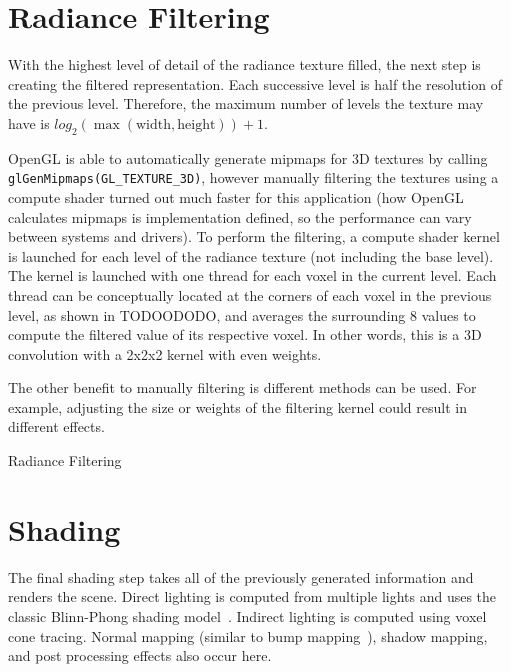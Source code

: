 
\section{Radiance Filtering}
With the highest level of detail of the radiance texture filled, the next step is creating the filtered representation. Each successive level is half the resolution of the previous level. Therefore, the maximum number of levels the texture may have is $log_2 (\max (\text{width}, \text{height})) + 1$.

OpenGL is able to automatically generate mipmaps for 3D textures by calling \verb#glGenMipmaps(GL_TEXTURE_3D)#, however manually filtering the textures using a compute shader turned out much faster for this application (how OpenGL calculates mipmaps is implementation defined, so the performance can vary between systems and drivers). To perform the filtering, a compute shader kernel is launched for each level of the radiance texture (not including the base level). The kernel is launched with one thread for each voxel in the current level. Each thread can be conceptually located at the corners of each voxel in the previous level, as shown in TODOODODO, and averages the surrounding 8 values to compute the filtered value of its respective voxel. In other words, this is a 3D convolution with a 2x2x2 kernel with even weights.

The other benefit to manually filtering is different methods can be used. For example, adjusting the size or weights of the filtering kernel could result in different effects.

\begin{algorithm}
    \caption{Radiance Filtering}
    \label{alg:radiancefiltering}
    \begin{algorithmic}
        \EndProcedure
    \end{algorithmic}
\end{algorithm}


\section{Shading}
The final shading step takes all of the previously generated information and renders the scene. Direct lighting is computed from multiple lights and uses the classic Blinn-Phong shading model~\cite{Phong:1975:ICG:360825.360839}. Indirect lighting is computed using voxel cone tracing. Normal mapping (similar to bump mapping~\cite{Blinn:1978:SWS:965139.507101}), shadow mapping, and post processing effects also occur here.

